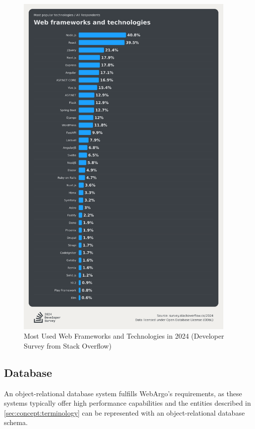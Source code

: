 \begin{figure}[htbp]
  \centering
  \includegraphics[width=0.95\textwidth]{gfx/figures/FrameworkSurvey2024.png}
  \caption{Most Used Web Frameworks and Technologies in 2024 (Developer Survey from Stack Overflow) \cite{frontend:popularity}}
  \label{fig:methodology:popularFE}
\end{figure}

\subsection{Database}
An object-relational database system fulfills WebArgo's requirements, as these systems typically offer high performance capabilities and the entities described in \autoref{sec:concept:terminology} can be represented with an object-relational database schema.

